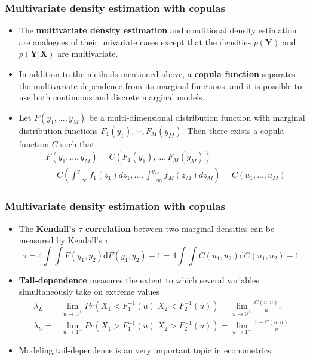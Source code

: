 \documentclass[11pt]{beamer}
\begin{document}
\begin{frame}
  \frametitle{Multivariate density estimation with copulas}
  \begin{itemize}
  \item The \textbf{multivariate density estimation} and conditional density estimation
    are analogues of their univariate cases except that the densities
    $p(\bm{Y})$ and $p(\bm{Y}|\bm{X})$ are multivariate.

  \item In addition to the methods mentioned above, a \textbf{copula function}
    separates the multivariate dependence from its marginal functions, and it
    is possible to use both continuous and discrete marginal models.

  \item Let $F(y_{1},...,y_{M})$ be a multi-dimensional distribution function
    with marginal distribution functions
    $F_{1}(y_{1}),\cdots,F_{M}(y_{M})$. Then there exists a copula function $C$
    \citep{sklar1959fonctions} such
    that
    \[
    \begin{split}
&F(y_{1},...,y_{M})=  C(F_{1}(y_{1}),...,F_{M}(y_{M}))\\
      &=  C\left(\int_{-\infty}^{y_{1}}f_{1}(z_{1})dz_{1},...,\int_{-\infty}^{y_{M}}f_{M}(z_{M})dz_{M}\right)=C(u_{1},...,u_{M})
    \end{split}
    \]
  \end{itemize}

\end{frame}


\begin{frame}
  \frametitle{Multivariate density estimation with copulas}

  \begin{itemize}
  \item The \textbf{Kendall's $\tau$ correlation} between two marginal
    densities can be measured by Kendall's $\tau$
    \[
    \tau=4\int\int F(y_{1},y_{2})\mathrm{d}F(y_{1},y_{2})-1=4\int\int
    C(u_{1},u_{2})\mathrm{d}C(u_{1},u_{2})-1.
    \]

  \item \textbf{Tail-dependence} measures the extent to which
    several variables simultaneously take on extreme values
    \[
    \begin{split}\lambda_{L}= & \lim\limits _{u\to0^{+}}Pr(X_{1}<F_{1}^{-1}(u)|X_{2}<F_{2}^{-1}(u))=\lim\limits _{u\to0^{+}}\frac{C(u,u)}{u},\\
      \lambda_{U}= & \lim\limits _{u\to1^{-}}Pr(X_{1}>F_{1}^{-1}(u)|X_{2}>F_{2}^{-1}(u))=\lim\limits _{u\to1^{-}}\frac{1-C(u,u)}{1-u}.
    \end{split}
    \]

  \item Modeling tail-dependence is an very important topic in econometrics
    \citep{joe1997multivariate} \citep{patton2012review}.

  \end{itemize}



\end{frame}
\end{document}
